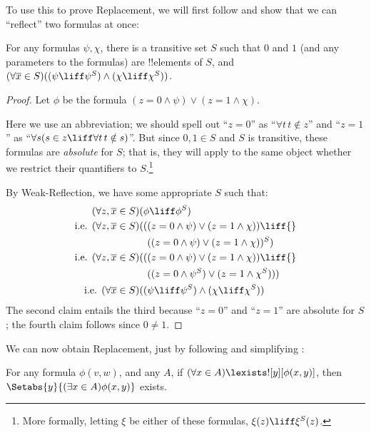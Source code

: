 \documentclass[../../../include/open-logic-section]{subfiles}
\begin{document}
To use this to prove Replacement, we will first follow \citet[first
part of Theorem 2]{Levy1960} and show that we can ``reflect'' two
formulas at once:

\begin{lem}
For any formulas $\psi, \chi$, there is a transitive set $S$ such that
$0$ and $1$ (and any parameters to the formulas) are !!{element}s of
$S$, and $(\forall \overline{x} \in S)((\psi \liff \psi^S) \land (\chi
\liff \chi^S))$.
\end{lem}

\begin{proof}
Let $\phi$ be the formula $(z = 0 \land \psi) \lor (z = 1 \land \chi)$. 

Here we use an abbreviation; we should spell out ``$z = 0$'' as
``$\forall t\, t \notin z$'' and ``$z =1$'' as ``$\forall s(s \in z
\liff \forall t\, t \notin s)$''. But since $0, 1 \in S$ and $S$ is
transitive, these formulas are \emph{absolute} for $S$; that is, they
will apply to the same object whether we restrict their quantifiers to
$S$.\footnote{More formally, letting $\xi$ be either of these
formulas, $\xi(z) \liff \xi^S(z)$.}

By Weak-Reflection, we have some appropriate $S$ such that:
\begin{align*}
	(\forall z, \overline{x} \in S)(&\phi \liff \phi^S)\\
	\text{i.e. }(\forall z, \overline{x} \in S)(&((z = 0 \land \psi) \lor (z = 1 \land \chi)) \liff {}\\
	&\phantom{(}((z = 0 \land \psi) \lor (z = 1 \land \chi))^S)\\
	\text{i.e. }(\forall z, \overline{x} \in S)(&((z = 0 \land \psi) \lor (z = 1 \land \chi))\liff {}\\
	&\phantom{(}((z = 0 \land \psi^S) \lor (z = 1 \land \chi^S)))\\
	\text{i.e. }(\forall \overline{x} \in S)(&(\psi \liff \psi^S) \land (\chi \liff \chi^S))
\end{align*}
The second claim entails the third because ``$z = 0$'' and ``$z=1$''
are absolute for $S$; the fourth claim follows since $0 \neq 1$.
\end{proof}\noindent We can now obtain Replacement, just by following and simplifying 
\citet[Theorem 6]{Levy1960}:

\begin{thm}\label{thm:replacement} 
For any formula $\phi(v,w)$, and any $A$, if $(\forall x \in A)\lexists![y][\phi(x,y)]$, then
$\Setabs{y}{(\exists x \in A)\phi(x,y)}$ exists.
\end{thm}
\end{document}
